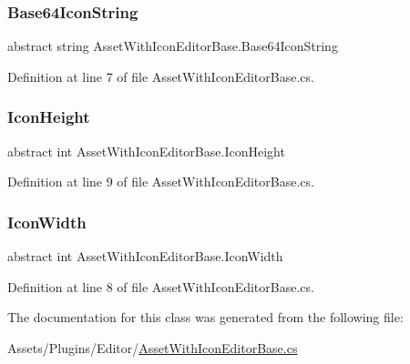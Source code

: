 \subsubsection{\texorpdfstring{Base64\+Icon\+String}{Base64IconString}}
{\footnotesize\ttfamily abstract string Asset\+With\+Icon\+Editor\+Base.\+Base64\+Icon\+String\hspace{0.3cm}{\ttfamily [get]}}



Definition at line 7 of file Asset\+With\+Icon\+Editor\+Base.\+cs.

\mbox{\label{class_asset_with_icon_editor_base_a4b3eae9920019826ba98bf5cd8ce9126}} 
\subsubsection{\texorpdfstring{Icon\+Height}{IconHeight}}
{\footnotesize\ttfamily abstract int Asset\+With\+Icon\+Editor\+Base.\+Icon\+Height\hspace{0.3cm}{\ttfamily [get]}}



Definition at line 9 of file Asset\+With\+Icon\+Editor\+Base.\+cs.

\mbox{\label{class_asset_with_icon_editor_base_af354b35247eada1a7ba2c5d613fc6664}} 
\subsubsection{\texorpdfstring{Icon\+Width}{IconWidth}}
{\footnotesize\ttfamily abstract int Asset\+With\+Icon\+Editor\+Base.\+Icon\+Width\hspace{0.3cm}{\ttfamily [get]}}



Definition at line 8 of file Asset\+With\+Icon\+Editor\+Base.\+cs.



The documentation for this class was generated from the following file\+:\begin{DoxyCompactItemize}
\item 
Assets/\+Plugins/\+Editor/\mbox{\hyperlink{_asset_with_icon_editor_base_8cs}{Asset\+With\+Icon\+Editor\+Base.\+cs}}\end{DoxyCompactItemize}
